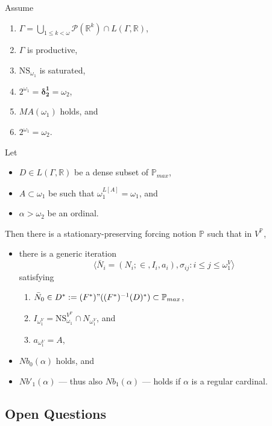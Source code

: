 \documentclass[12pt]{article}
\numberwithin{equation}{section}
\begin{document}
\begin{cor}\label{nbcoro2}
Assume
\begin{enumerate}[label=(\roman*), leftmargin=40pt]
    \item $\Gamma  = \bigcup_{1 \leq k < \omega} \mathcal{P}(\mathbb{R}^{k}) \cap L(\Gamma, \mathbb{R})$,
    \item $\Gamma$ is productive,
    \item $\mathrm{NS}_{\omega_1}$ is saturated,
    \item $2^{\omega_1} = \mathbf{\delta^1_2} = \omega_2$, 
    \item $MA(\omega_1)$ holds, and
    \item $2^{\omega_1} = \omega_2$.
\end{enumerate}
Let 
\begin{itemize}
    \item $D \in L(\Gamma, \mathbb{R})$ be a dense subset of $\mathbb{P}_{max}$,
    \item $A \subset \omega_1$ be such that $\omega_1^{L[A]} = \omega_1$, and
    \item $\alpha > \omega_2$ be an ordinal.
\end{itemize}
Then there is a stationary-preserving forcing notion $\mathbb{P}$ such that in $V^{\mathbb{P}}$,
\begin{itemize}
    \item there is a generic iteration $$\langle \bar{N}_i = (N_i; \in, I_i, a_i), \sigma_{ij} : i \leq j \leq \omega_1^V \rangle$$ satisfying 
    \begin{enumerate}[label=(\arabic*), leftmargin=40pt]
        \item $\bar{N}_0 \in D^* := (F^*) " ((F^*)^{-1}(D)^*) \subset \mathbb{P}_{max}$,
        \item $I_{\omega_1^V} = \mathrm{NS}_{\omega_1}^{V^{\mathbb{P}}} \cap N_{\omega_1^V}$, and
        \item $a_{\omega_1^V} = A$, 
    \end{enumerate}
    \item $Nb_0(\alpha)$ holds, and
    \item $Nb'_1(\alpha)$ --- thus also $Nb_1(\alpha)$ --- holds if $\alpha$ is a regular cardinal.
\end{itemize}
\end{cor}

\subsection{Open Questions}
\end{document}
